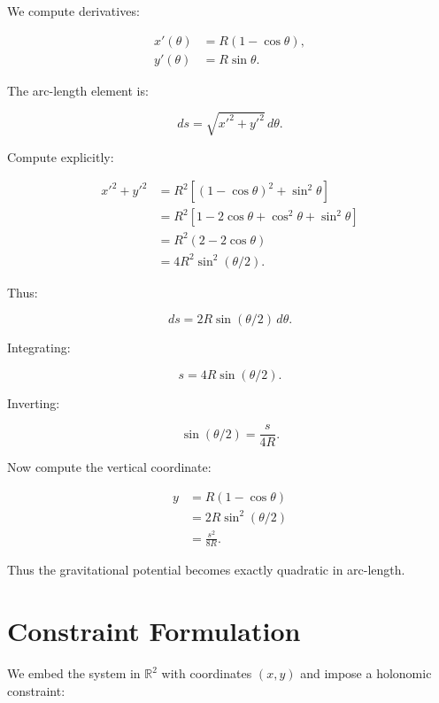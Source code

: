 \documentclass[11pt]{article}
\begin{document}
We compute derivatives:

\begin{align}
x'(\theta) &= R(1 - \cos\theta), \\
y'(\theta) &= R\sin\theta.
\end{align}

The arc-length element is:

\begin{equation}
ds = \sqrt{x'^2 + y'^2} \, d\theta.
\end{equation}

Compute explicitly:

\begin{align}
x'^2 + y'^2
&= R^2 \left[(1 - \cos\theta)^2 + \sin^2\theta \right] \\
&= R^2 \left[1 - 2\cos\theta + \cos^2\theta + \sin^2\theta \right] \\
&= R^2 (2 - 2\cos\theta) \\
&= 4R^2 \sin^2(\theta/2).
\end{align}

Thus:

\begin{equation}
ds = 2R \sin(\theta/2)\, d\theta.
\end{equation}

Integrating:

\begin{equation}
s = 4R \sin(\theta/2).
\end{equation}

Inverting:

\begin{equation}
\sin(\theta/2) = \frac{s}{4R}.
\end{equation}

Now compute the vertical coordinate:

\begin{align}
y &= R(1 - \cos\theta) \\
  &= 2R \sin^2(\theta/2) \\
  &= \frac{s^2}{8R}.
\end{align}

Thus the gravitational potential becomes exactly quadratic in arc-length.

\section{Constraint Formulation}

We embed the system in $\mathbb{R}^2$ with coordinates $(x,y)$ and impose a holonomic constraint:
\end{document}
